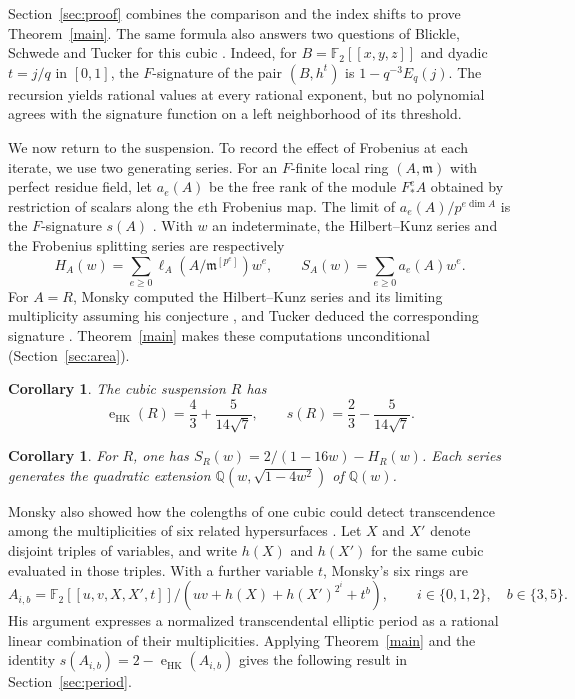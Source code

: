 \documentclass[11pt,a4paper,reqno]{amsart}
\numberwithin{equation}{section}
\theoremstyle{plain}
\newtheorem{maincorollary}[mainresult]{Corollary}
\newcommand{\m}{\mathfrak m}
\newcommand{\eHK}{\operatorname{e}_{\mathrm{HK}}}
\begin{document}
Section~\ref{sec:proof} combines the comparison and the index shifts to prove Theorem~\ref{main}. The same formula also answers two questions of Blickle, Schwede and Tucker for this cubic \cite[Questions~4.7--4.8]{BST}. Indeed, for $B=\mathbb F_2[[x,y,z]]$ and dyadic $t=j/q$ in $[0,1]$, the $F$-signature of the pair $(B,h^t)$ is $1-q^{-3}E_q(j)$. The recursion yields rational values at every rational exponent, but no polynomial agrees with the signature function on a left neighborhood of its threshold.

We now return to the suspension. To record the effect of Frobenius at each iterate, we use two generating series. For an $F$-finite local ring $(A,\m)$ with perfect residue field, let $a_e(A)$ be the free rank of the module $F_*^e A$ obtained by restriction of scalars along the $e$th Frobenius map. The limit of $a_e(A)/p^{e\dim A}$ is the $F$-signature $s(A)$ \cite{HL02,SVdB,Tuc12}. With $w$ an indeterminate, the Hilbert--Kunz series and the Frobenius splitting series are respectively
\[
 H_A(w)=\sum_{e\ge0}\ell_A(A/\m^{[p^e]})w^e,
 \qquad S_A(w)=\sum_{e\ge0}a_e(A)w^e.
\]
For $A=R$, Monsky computed the Hilbert--Kunz series and its limiting multiplicity assuming his conjecture \cite{Mon08,Mtrans}, and Tucker deduced the corresponding signature \cite[Proposition~4.22]{Tuc12}. Theorem~\ref{main} makes these computations unconditional (Section~\ref{sec:area}).

\begin{maincorollary}\label{main:irr}
The cubic suspension $R$ has
\[
 \eHK(R)=\frac43+\frac{5}{14\sqrt7},\qquad
 s(R)=\frac23-\frac{5}{14\sqrt7}.
\]
\end{maincorollary}

\begin{maincorollary}\label{main:series}
For $R$, one has $S_R(w)=2/(1-16w)-H_R(w)$. Each series generates the quadratic extension $\mathbb Q(w,\sqrt{1-4w^2})$ of $\mathbb Q(w)$.
\end{maincorollary}

Monsky also showed how the colengths of one cubic could detect transcendence among the multiplicities of six related hypersurfaces \cite[Theorems~1.10 and~2.2]{Mtrans}. Let $X$ and $X'$ denote disjoint triples of variables, and write $h(X)$ and $h(X')$ for the same cubic evaluated in those triples. With a further variable $t$, Monsky's six rings are
\[
 A_{i,b}=\mathbb F_2[[u,v,X,X',t]]/
 (uv+h(X)+h(X')^{2^i}+t^b),
 \qquad i\in\{0,1,2\},\quad b\in\{3,5\}.
\]
His argument expresses a normalized transcendental elliptic period as a rational linear combination of their multiplicities. Applying Theorem~\ref{main} and the identity $s(A_{i,b})=2-\eHK(A_{i,b})$ gives the following result in Section~\ref{sec:period}.
\end{document}

